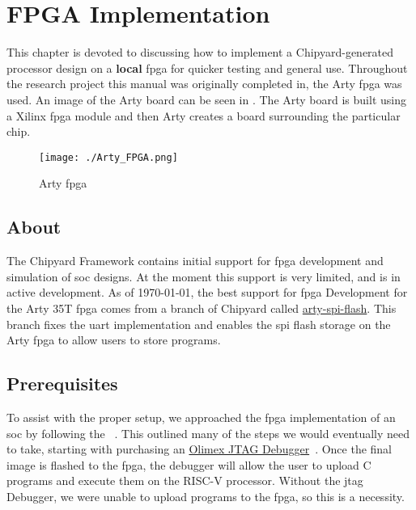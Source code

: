 \chapter{FPGA Implementation}\label{chap:FPGA_Implementation}
This chapter is devoted to discussing how to implement a Chipyard-generated processor design on a \textbf{local} \gls{fpga} for quicker testing and general use.
Throughout the research project this manual was originally completed in, the Arty \gls{fpga} was used.
An image of the Arty board can be seen in .
The Arty board is built using a Xilinx \gls{fpga} module and then Arty creates a board surrounding the particular chip.

\begin{figure}[h!tbp]
  \centering
  \texttt{[image: ./Arty\_FPGA.png]}
  \caption{Arty \Gls{fpga}}
  \label{fig:Arty_FPGA}
\end{figure}

\section{About}\label{sec:About}
The Chipyard Framework contains initial support for \gls{fpga} development and simulation of \gls{soc} designs.
At the moment this support is very limited, and is in active development.
As of \today, the best support for \Gls{fpga} Development for the Arty 35T \Gls{fpga} comes from a branch of Chipyard called \href{https://github.com/ucb-bar/chipyard/tree/arty-spi-flash}{arty-spi-flash}.
This branch fixes the \gls{uart} implementation and enables the \gls{spi} flash storage on the Arty \Gls{fpga} to allow users to store programs.

\section{Prerequisites}\label{sec:Prerequisites}
To assist with the proper setup, we approached the \Gls{fpga} implementation of an \Gls{soc} by following the ~\cite{FreedomDevGuide}.
This outlined many of the steps we would eventually need to take, starting with purchasing an \href{https://www.digikey.com/en/products/detail/olimex-ltd/ARM-USB-TINY-H/3471388}{Olimex JTAG Debugger}~\cite{OlimexJTAG}.
Once the final image is flashed to the \Gls{fpga}, the debugger will allow the user to upload C programs and execute them on the RISC-V processor.
Without the \gls{jtag} Debugger, we were unable to upload programs to the \Gls{fpga}, so this is a necessity.

